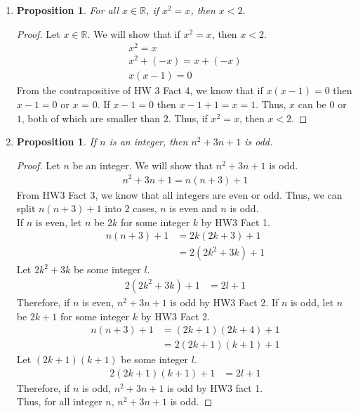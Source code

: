 \documentclass{article}
\newtheorem{prop}[thm]{Proposition}
\begin{document}
\begin{enumerate}
\item \begin{prop}
    For all $x \in \mathbb{R}$, if $x^2 = x$, then $x < 2$.
\end{prop}

\begin{proof}
Let $x \in \mathbb{R}$. We will show that if $x^2 = x$, then $x < 2$.
\begin{gather}
    x^2 = x \\
    x^2 + (-x) = x + (-x) \\
    x(x - 1) = 0
\end{gather}
From the contrapositive of HW 3 Fact 4, we know that if $x(x - 1) = 0$ then $x - 1 = 0$ or $x$ = 0. If $x - 1 = 0$ then $x - 1 + 1 = x = 1$. Thus, $x$ can be $0$ or $1$, both of which are smaller than $2$. Thus, if $x^2 = x$, then $x < 2$.
\end{proof}

\item \begin{prop}
     If $n$ is an integer, then $n^2 + 3n + 1$ is odd.
\end{prop}

\begin{proof}
Let $n$ be an integer. We will show that $n^2 + 3n + 1$ is odd.
\begin{gather}
    n^2 + 3n + 1 = n(n + 3) + 1
\end{gather}
From HW3 Fact 3, we know that all integers are even or odd. Thus, we can split $n(n + 3) + 1$ into $2$ cases, $n$ is even and $n$ is odd. \\
If $n$ is even, let $n$ be $2k$ for some integer $k$ by HW3 Fact 1.
\begin{align}
    n(n + 3) + 1 &= 2k(2k + 3) + 1 \\
    &= 2(2k^2 + 3k) + 1
\end{align}
Let $2k^2 + 3k$ be some integer $l$.
\begin{align}
    2(2k^2 + 3k) + 1 &= 2l + 1
\end{align}
Therefore, if $n$ is even, $n^2 + 3n + 1$ is odd by HW3 Fact 2.
If $n$ is odd, let $n$ be $2k + 1$ for some integer $k$ by HW3 Fact 2.
\begin{align}
    n(n + 3) + 1 &= (2k + 1)(2k + 4) + 1 \\
    &= 2(2k + 1)(k + 1) + 1
\end{align}
Let $(2k + 1)(k + 1)$ be some integer $l$.
\begin{align}
    2(2k + 1)(k + 1) + 1 &= 2l + 1
\end{align}
Therefore, if $n$ is odd, $n^2 + 3n + 1$ is odd by HW3 fact 1. \\
Thus, for all integer $n$, $n^2 + 3n + 1$ is odd.
\end{proof}


\end{enumerate}
\end{document}
